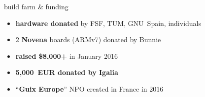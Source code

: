 \documentclass{beamer}
\newcommand{\highlight}[1]{\alert{\textbf{#1}}}
\begin{document}
\begin{frame}{build farm \& funding}
  \Large{
  \begin{itemize}
    \item \highlight{hardware donated} by FSF, TUM, GNU~Spain,
      individuals
    \item 2 \highlight{Novena} boards (ARMv7) donated by Bunnie
    \item \highlight{raised \$8,000+} in January 2016
    \item \highlight{5,000~EUR donated by Igalia}
    \item ``\highlight{Guix Europe}'' NPO created in France in 2016
  \end{itemize}
  }

\end{frame}
\end{document}
